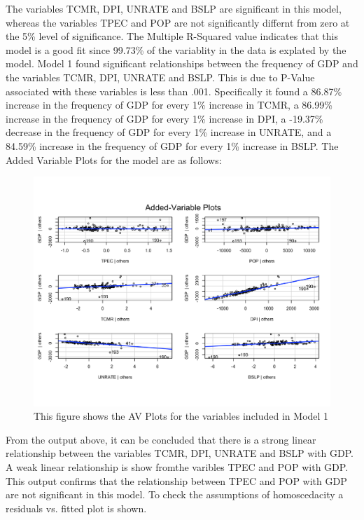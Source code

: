 \documentclass[12pt]{article}
\begin{document}
The variables TCMR, DPI, UNRATE and BSLP are significant in this model, whereas the variables TPEC and POP are not significantly differnt from zero at the 5\% level of significance.  
The Multiple R-Squared value indicates that this model is a good fit since 99.73\% of the variablity in the data is explated by the model. 
Model 1 found significant relationships between the frequency of GDP and the variables TCMR, DPI, UNRATE and BSLP. 
This is due to P-Value associated with these variables is less than .001. 
Specifically it found a 86.87\% increase in the frequency of GDP for every 1\% increase in TCMR, a 86.99\% increase in the frequency of GDP for every 1\% increase in DPI, a -19.37\% decrease in the frequency of GDP for every 1\% increase in UNRATE, and a 84.59\% increase in the frequency of GDP for every 1\% increase in BSLP.
The Added Variable Plots for the model are as follows:
\begin{figure}[H]
  \centering
  \includegraphics[scale = .5]{AVP1}
  \caption{This figure shows the AV Plots for the variables included in Model 1}
\end{figure}
From the output above, it can be concluded that there is a strong linear relationship between the variables TCMR, DPI, UNRATE and BSLP with GDP.
A weak linear relationship is show fromthe varibles TPEC and POP with GDP. 
This output confirms that the relationship between TPEC and POP with GDP are not significant in this model. 
To check the assumptions of homoscedacity a residuals vs. fitted plot is shown.
\end{document}
